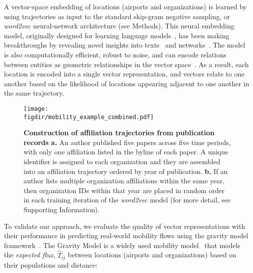 \documentclass[12pt]{article} %
\def\figdir{../Figs}
\def\SI{Supporting Information}
\begin{document}
A vector-space embedding of locations (airports and organizations) is learned by using trajectories as input to the standard skip-gram negative sampling, or \textit{word2vec} neural-network architecture (see Methods).
This neural embedding model, originally designed for learning language models~\autocite{mikolov2013word2vec}, has been making breakthroughs by revealing novel insights into texts~\autocite{linzhuo2020hyperbolic, tshitoyan2019mat2vec, garg2018gender, kozlowski2018geometry, hamilton2016diachronic, le2014doc2vec, nakandala2017gendered} and networks~\autocite{grover2016node2vec}.
The model is also computationally efficient, robust to noise, and can encode relations between entities as geometric relationships in the vector space~\autocite{levy2014neural, nakandala2017gendered, kozlowski2018geometry, an2018semaxis}.
As a result, each location is encoded into a single vector representation, and vectors relate to one another based on the likelihood of locations appearing adjacent to one another in the same trajectory.

 
%
%
\begin{figure}[ht!]
    \centering
    \texttt{[image: \\figdir/mobility\_example\_combined.pdf]}
    \caption{
        \textbf{Construction of affiliation trajectories from publication records}
        \textbf{a.}
        An author published five papers across five time periods, with only one affiliation listed in the byline of each paper.
        A unique identifier is assigned to each organization and they are assembled into an affiliation trajectory ordered by year of publication.
        \textbf{b.}
        If an author lists multiple organization affiliations within the same year, then organization IDs within that year are placed in random order in each training iteration of the \textit{word2vec} model (for more detail, see \SI).
    }
    \label{fig:methods:mobility_sentence}
\end{figure}


To validate our approach, we evaluate the quality of vector representations with their performance in predicting real-world mobility flows using the gravity model framework~\autocite{zipf1946gravity}.
The Gravity Model is a widely used mobility model~\autocite{curiel2018citygravity, jung2008highwaygravity, hong2016busgravity, truscott2012epidemicgravity} that models the \textit{expected flux}, $\hat{T}_{ij}$ between locations (airports and organizations) based on their populations and distance:
\end{document}
